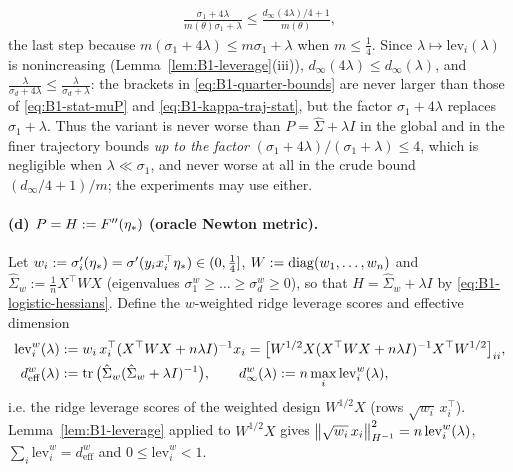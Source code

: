 \begin{remark}
\begin{align}
\frac{\sigma_1+4\lambda}{m(\theta)\sigma_1+\lambda}\le\frac{d_\infty(4\lambda)/4+1}{m(\theta)} ,\label{eq:B1-quarter-bounds}
\end{align}
the last step because $m(\sigma_1+4\lambda)\le m\sigma_1+\lambda$ when $m\le\frac14$. Since
$\lambda\mapsto\mathrm{lev}_i(\lambda)$ is nonincreasing (Lemma~\ref{lem:B1-leverage}(iii)),
$d_\infty(4\lambda)\le d_\infty(\lambda)$, and $\frac{\lambda}{\sigma_d+4\lambda}\le\frac{\lambda}{\sigma_d+\lambda}$:
the brackets in \eqref{eq:B1-quarter-bounds} are never larger than those of \eqref{eq:B1-stat-muP} and
\eqref{eq:B1-kappa-traj-stat}, but the factor $\sigma_1+4\lambda$ replaces $\sigma_1+\lambda$. Thus the
variant is never worse than $P=\hat\Sigma+\lambda I$ in the global and in the finer trajectory bounds
\emph{up to the factor} $(\sigma_1+4\lambda)/(\sigma_1+\lambda)\le4$, which is negligible when
$\lambda\ll\sigma_1$, and never worse at all in the crude bound $(d_\infty/4+1)/m$; the experiments may use
either.
\end{remark}

\paragraph{(d) $P=H:=F''(\eta_\ast)$ (oracle Newton metric).}
Let $w_i:=\sigma_i'(\eta_\ast)=\sigma'(y_ix_i^\top\eta_\ast)\in(0,\frac14]$, $W:=\operatorname{diag}(w_1,\dots,w_n)$ and
$\hat\Sigma_w:=\frac1nX^\top WX$ (eigenvalues $\sigma_1^w\ge\dots\ge\sigma_d^w\ge0$), so that
$H=\hat\Sigma_w+\lambda I$ by \eqref{eq:B1-logistic-hessians}. Define the $w$-weighted ridge leverage
scores and effective dimension
\begin{align}
\mathrm{lev}^w_i(\lambda)&:=w_i\,x_i^\top(X^\top WX+n\lambda I)^{-1}x_i
=\big[W^{1/2}X(X^\top WX+n\lambda I)^{-1}X^\top W^{1/2}\big]_{ii},\label{eq:B1-wleverage}\\
d^w_{\mathrm{eff}}(\lambda)&:=\operatorname{tr}\big(\hat\Sigma_w(\hat\Sigma_w+\lambda I)^{-1}\big),\qquad
d^w_\infty(\lambda):=n\max_i\mathrm{lev}^w_i(\lambda),\nonumber
\end{align}
i.e. the ridge leverage scores of the weighted design $W^{1/2}X$ (rows $\sqrt{w_i}\,x_i^\top$).
Lemma~\ref{lem:B1-leverage} applied to $W^{1/2}X$ gives $\left\|\sqrt{w_i}\,x_i\right\|_{H^{-1}}^2=n\,\mathrm{lev}^w_i(\lambda)$,
$\sum_i\mathrm{lev}^w_i=d^w_{\mathrm{eff}}$ and $0\le\mathrm{lev}^w_i<1$.

